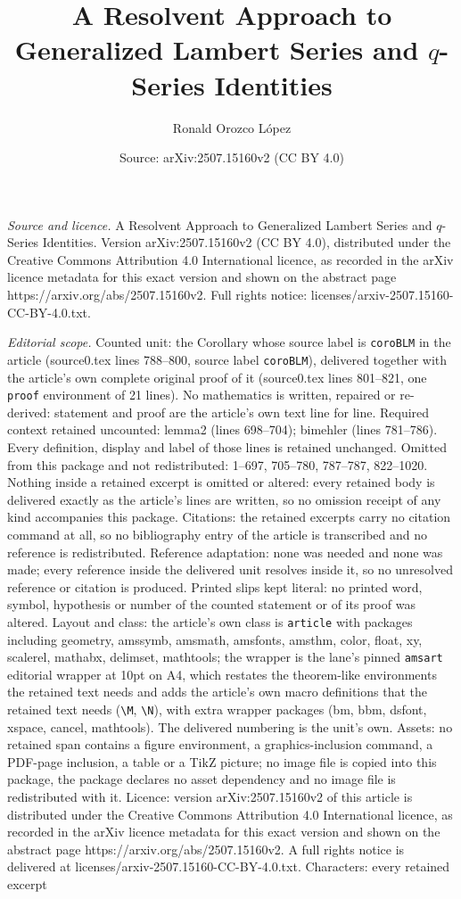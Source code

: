 \documentclass[10pt,a4paper]{amsart}
\title[A Resolvent Approach to Generalized Lambert Series and $q$-S]{A Resolvent Approach to Generalized Lambert Series and $q$-Series Identities}
\author{Ronald Orozco L\'opez}
\date{Source: arXiv:2507.15160v2 (CC BY 4.0)}
\begin{document}
\maketitle

\noindent\emph{Source and licence.} A Resolvent Approach to Generalized Lambert Series and $q$-Series Identities. Version arXiv:2507.15160v2 (CC BY 4.0), distributed under the Creative Commons Attribution 4.0 International licence, as recorded in the arXiv licence metadata for this exact version and shown on the abstract page https://arxiv.org/abs/2507.15160v2. Full rights notice: licenses/arxiv-2507.15160-CC-BY-4.0.txt.\par\smallskip

\noindent\textit{Editorial scope.} Counted unit: the Corollary whose source label is \texttt{coroBLM} in the article (source0.tex lines 788--800, source label \texttt{coroBLM}), delivered together with the article's own complete original proof of it (source0.tex lines 801--821, one \texttt{proof} environment of 21 lines). No mathematics is written, repaired or re-derived: statement and proof are the article's own text line for line. Required context retained uncounted: lemma2 (lines 698--704); bimehler (lines 781--786). Every definition, display and label of those lines is retained unchanged. Omitted from this package and not redistributed: 1--697, 705--780, 787--787, 822--1020. Nothing inside a retained excerpt is omitted or altered: every retained body is delivered exactly as the article's lines are written, so no omission receipt of any kind accompanies this package. Citations: the retained excerpts carry no citation command at all, so no bibliography entry of the article is transcribed and no reference is redistributed. Reference adaptation: none was needed and none was made; every reference inside the delivered unit resolves inside it, so no unresolved reference or citation is produced. Printed slips kept literal: no printed word, symbol, hypothesis or number of the counted statement or of its proof was altered. Layout and class: the article's own class is \texttt{article} with packages including geometry, amssymb, amsmath, amsfonts, amsthm, color, float, xy, scalerel, mathabx, delimset, mathtools; the wrapper is the lane's pinned \texttt{amsart} editorial wrapper at 10pt on A4, which restates the theorem-like environments the retained text needs and adds the article's own macro definitions that the retained text needs (\texttt{\textbackslash M}, \texttt{\textbackslash N}), with extra wrapper packages (bm, bbm, dsfont, xspace, cancel, mathtools). The delivered numbering is the unit's own. Assets: no retained span contains a figure environment, a graphics-inclusion command, a PDF-page inclusion, a table or a TikZ picture; no image file is copied into this package, the package declares no asset dependency and no image file is redistributed with it. Licence: version arXiv:2507.15160v2 of this article is distributed under the Creative Commons Attribution 4.0 International licence, as recorded in the arXiv licence metadata for this exact version and shown on the abstract page https://arxiv.org/abs/2507.15160v2. A full rights notice is delivered at licenses/arxiv-2507.15160-CC-BY-4.0.txt. Characters: every retained excerpt 
\end{document}
